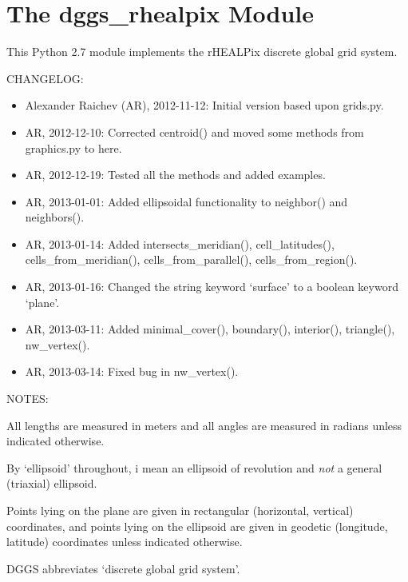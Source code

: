 \documentclass[a4paper,12ptopenany,oneside]{sphinxmanual}
\begin{document}
\chapter{The dggs\_rhealpix Module}
\label{dggs_rhealpix:module-dggs_rhealpix}\label{dggs_rhealpix:the-dggs-rhealpix-module}\label{dggs_rhealpix::doc}
This Python 2.7 module implements the rHEALPix discrete global grid system.

CHANGELOG:
\begin{itemize}
\item {} 
Alexander Raichev (AR), 2012-11-12: Initial version based upon grids.py.

\item {} 
AR, 2012-12-10: Corrected centroid() and moved some methods from graphics.py to here.

\item {} 
AR, 2012-12-19: Tested all the methods and added examples.

\item {} 
AR, 2013-01-01: Added ellipsoidal functionality to neighbor() and neighbors().

\item {} 
AR, 2013-01-14: Added intersects\_meridian(), cell\_latitudes(), cells\_from\_meridian(), cells\_from\_parallel(), cells\_from\_region().

\item {} 
AR, 2013-01-16: Changed the string keyword `surface' to a boolean keyword `plane'.

\item {} 
AR, 2013-03-11: Added minimal\_cover(), boundary(), interior(), triangle(), nw\_vertex().

\item {} 
AR, 2013-03-14: Fixed bug in nw\_vertex().

\end{itemize}

NOTES:

All lengths are measured in meters and all angles are measured in radians 
unless indicated otherwise.

By `ellipsoid' throughout, i mean an ellipsoid of revolution and \emph{not} a general (triaxial) ellipsoid.

Points lying on the plane are given in rectangular (horizontal, vertical) coordinates, and points lying on the ellipsoid are given in geodetic (longitude, latitude) coordinates unless indicated otherwise.

DGGS abbreviates `discrete global grid system'.
\end{document}
